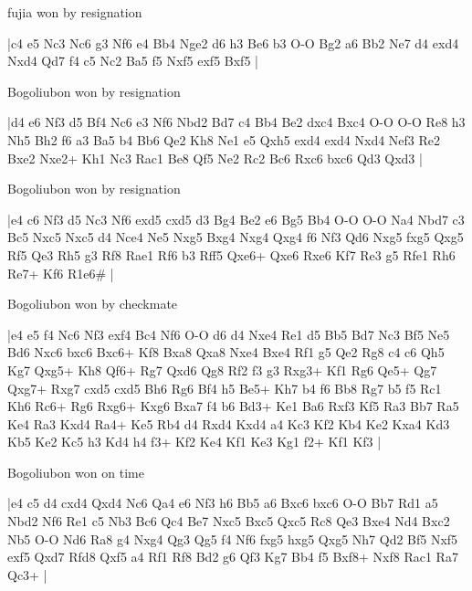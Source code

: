 fujia won by resignation

\makegametitle
|c4 e5 Nc3 Nc6 g3 Nf6 e4 Bb4 Nge2 d6 h3 Be6 b3 O-O Bg2 a6 Bb2 Ne7 d4 exd4 Nxd4 Qd7 f4 c5 Nc2 Ba5 f5 Nxf5 exf5 Bxf5  |

\showboard

Bogoliubon won by resignation

\makegametitle
|d4 e6 Nf3 d5 Bf4 Nc6 e3 Nf6 Nbd2 Bd7 c4 Bb4 Be2 dxc4 Bxc4 O-O O-O Re8 h3 Nh5 Bh2 f6 a3 Ba5 b4 Bb6 Qe2 Kh8 Ne1 e5 Qxh5 exd4 exd4 Nxd4 Nef3 Re2 Bxe2 Nxe2+ Kh1 Nc3 Rac1 Be8 Qf5 Ne2 Rc2 Bc6 Rxc6 bxc6 Qd3 Qxd3  |

\showboard

Bogoliubon won by resignation

\makegametitle
|e4 c6 Nf3 d5 Nc3 Nf6 exd5 cxd5 d3 Bg4 Be2 e6 Bg5 Bb4 O-O O-O Na4 Nbd7 c3 Bc5 Nxc5 Nxc5 d4 Nce4 Ne5 Nxg5 Bxg4 Nxg4 Qxg4 f6 Nf3 Qd6 Nxg5 fxg5 Qxg5 Rf5 Qe3 Rh5 g3 Rf8 Rae1 Rf6 b3 Rff5 Qxe6+ Qxe6 Rxe6 Kf7 Re3 g5 Rfe1 Rh6 Re7+ Kf6 R1e6\#  |

\showboard

Bogoliubon won by checkmate

\makegametitle
|e4 e5 f4 Nc6 Nf3 exf4 Bc4 Nf6 O-O d6 d4 Nxe4 Re1 d5 Bb5 Bd7 Nc3 Bf5 Ne5 Bd6 Nxc6 bxc6 Bxc6+ Kf8 Bxa8 Qxa8 Nxe4 Bxe4 Rf1 g5 Qe2 Rg8 c4 c6 Qh5 Kg7 Qxg5+ Kh8 Qf6+ Rg7 Qxd6 Qg8 Rf2 f3 g3 Rxg3+ Kf1 Rg6 Qe5+ Qg7 Qxg7+ Rxg7 cxd5 cxd5 Bh6 Rg6 Bf4 h5 Be5+ Kh7 b4 f6 Bb8 Rg7 b5 f5 Rc1 Kh6 Rc6+ Rg6 Rxg6+ Kxg6 Bxa7 f4 b6 Bd3+ Ke1 Ba6 Rxf3 Kf5 Ra3 Bb7 Ra5 Ke4 Ra3 Kxd4 Ra4+ Ke5 Rb4 d4 Rxd4 Kxd4 a4 Kc3 Kf2 Kb4 Ke2 Kxa4 Kd3 Kb5 Ke2 Kc5 h3 Kd4 h4 f3+ Kf2 Ke4 Kf1 Ke3 Kg1 f2+ Kf1 Kf3  |

\showboard

Bogoliubon won on time

\makegametitle
|e4 c5 d4 cxd4 Qxd4 Nc6 Qa4 e6 Nf3 h6 Bb5 a6 Bxc6 bxc6 O-O Bb7 Rd1 a5 Nbd2 Nf6 Re1 c5 Nb3 Bc6 Qc4 Be7 Nxc5 Bxc5 Qxc5 Rc8 Qe3 Bxe4 Nd4 Bxc2 Nb5 O-O Nd6 Ra8 g4 Nxg4 Qg3 Qg5 f4 Nf6 fxg5 hxg5 Qxg5 Nh7 Qd2 Bf5 Nxf5 exf5 Qxd7 Rfd8 Qxf5 a4 Rf1 Rf8 Bd2 g6 Qf3 Kg7 Bb4 f5 Bxf8+ Nxf8 Rac1 Ra7 Qc3+  |

